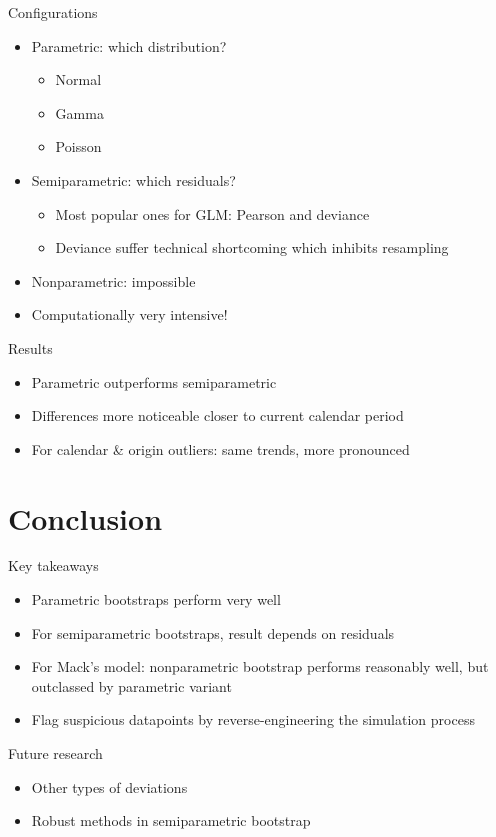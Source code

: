 \documentclass[tikz]{beamer}
\begin{document}
\begin{frame}{Configurations}
  \begin{itemize}
    \item Parametric: which distribution?
          \begin{itemize}
            \item Normal
            \item Gamma
            \item Poisson
          \end{itemize}
    \item Semiparametric: which residuals?
          \begin{itemize}
            \item Most popular ones for GLM: Pearson and deviance
            \item Deviance suffer technical shortcoming which inhibits resampling
          \end{itemize}
    \item Nonparametric: impossible
    \item Computationally very intensive!
  \end{itemize}
\end{frame}


\begin{frame}{Results}
  \begin{itemize}
    \item Parametric outperforms semiparametric
    \item Differences more noticeable closer to current calendar period
    \item For calendar \& origin outliers: same trends, more pronounced
  \end{itemize}
\end{frame}

\section{Conclusion}

\begin{frame}{Key takeaways}
  \begin{itemize}
    \item Parametric bootstraps perform very well
    \item For semiparametric bootstraps, result depends on residuals
    \item For Mack's model: nonparametric bootstrap performs reasonably well, but outclassed by parametric variant
    \item Flag suspicious datapoints by reverse-engineering the simulation process
  \end{itemize}
\end{frame}

\begin{frame}{Future research}
  \begin{itemize}
    \item Other types of deviations
    \item Robust methods in semiparametric bootstrap
  \end{itemize}
\end{frame}
\end{document}
